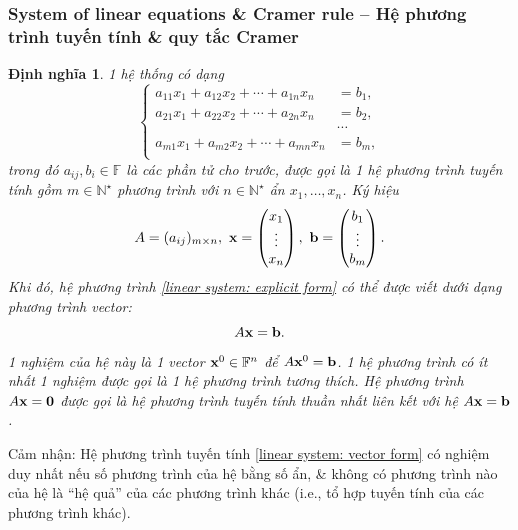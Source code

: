 \documentclass{article}
\newtheorem{dinhnghia}{Định nghĩa}
\begin{document}

\subsubsection{System of linear equations \& Cramer rule -- Hệ phương trình tuyến tính \& quy tắc Cramer}

\begin{dinhnghia}
	1 hệ thống có dạng
	\begin{equation}
		\label{linear system: explicit form}
		\left\{\begin{split}
			a_{11}x_1 + a_{12}x_2 + \cdots + a_{1n}x_n &= b_1,\\
			a_{21}x_1 + a_{22}x_2 + \cdots + a_{2n}x_n &= b_2,\\
			&\cdots\\
			a_{m1}x_1 + a_{m2}x_2 + \cdots + a_{mn}x_n &= b_m,\\
		\end{split}\right.
	\end{equation}
	trong đó $a_{ij},b_i\in\mathbb{F}$ là các phần tử cho trước, được gọi là 1 {\rm hệ phương trình tuyến tính} gồm $m\in\mathbb{N}^\star$ phương trình với $n\in\mathbb{N}^\star$ ẩn $x_1,\ldots,x_n$. Ký hiệu
	\begin{equation*}
		A = (a_{ij})_{m\times n},\ {\bf x} = \begin{pmatrix}
			x_1\\\vdots\\x_n
		\end{pmatrix},\ {\bf b} = \begin{pmatrix}
			b_1\\\vdots\\b_m
		\end{pmatrix}.
	\end{equation*}
	Khi đó, hệ phương trình \eqref{linear system: explicit form} có thể được viết dưới dạng phương trình vector:
	\begin{equation}
		\label{linear system: vector form}
		A{\bf x} = {\bf b}.
	\end{equation}
	1 {\rm nghiệm} của hệ này là 1 vector ${\bf x}^0\in\mathbb{F}^n$ để $A{\bf x}^0 = {\bf b}$. 1 hệ phương trình có ít nhất 1 nghiệm được gọi là 1 {\rm hệ phương trình tương thích}. Hệ phương trình $A{\bf x} = {\bf0}$ được gọi là {\rm hệ phương trình tuyến tính thuần nhất} liên kết với hệ $A{\bf x} = {\bf b}$.
\end{dinhnghia}
Cảm nhận: Hệ phương trình tuyến tính \eqref{linear system: vector form} có nghiệm duy nhất nếu số phương trình của hệ bằng số ẩn, \& không có phương trình nào của hệ là ``hệ quả'' của các phương trình khác (i.e., tổ hợp tuyến tính của các phương trình khác).
\end{document}
